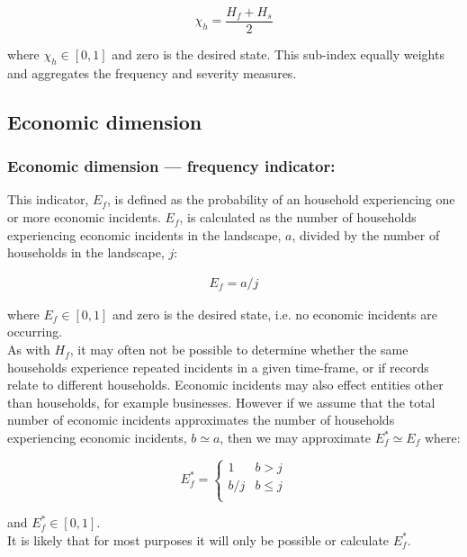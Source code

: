 \documentclass[fleqn,10pt]{olplainarticle}
\begin{document}
\begin{equation*}
    \chi_h = \frac{H_f + H_s}{2}
\end{equation*}

where $\chi_h \in [0,1]$ and zero is the desired state. This sub-index equally weights and aggregates the frequency and severity measures.\\

\subsection*{Economic dimension}

\subsubsection*{Economic dimension --- frequency indicator:}
This indicator, $E_f$, is defined as  the probability of an household experiencing one or more economic incidents. $E_f$, is calculated as the number of households experiencing economic incidents in the landscape, $a$, divided by the number of households in the landscape, $j$:

\begin{align*}
    E_f = a/j
\end{align*}

where $E_f \in [0,1]$ and zero is the desired state, i.e. no economic incidents are occurring.\\

As with $H_f$, it may often not be possible to determine whether the same households experience repeated incidents in a given time-frame, or if records relate to different households. Economic incidents may also effect entities other than households, for example businesses. However if we assume that the total number of economic incidents approximates the number of households experiencing economic incidents, $b \simeq a$, then we may approximate $E_f^\ast \simeq E_f$ where:

\begin{equation*}
    E_f^\ast = \begin{cases}
        1        & b > j \\
        b/j  & b \le j \\
    \end{cases}
\end{equation*}

and $E_f^\ast \in [0,1]$.\\

It is likely that for most purposes it will only be possible or calculate $E_f^\ast$.\\
\end{document}
